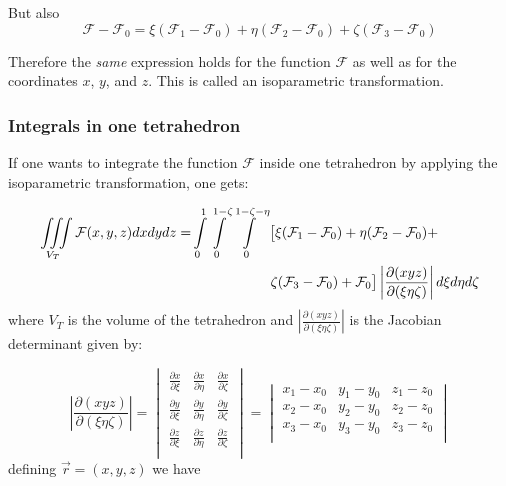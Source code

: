 \documentclass[10pt]{article}
\begin{document}
But also
\begin{equation}\label{parmf}
\mathcal{F}-\mathcal{F}_0=\xi(\mathcal{F}_1-\mathcal{F}_0)+\eta(\mathcal{F}_2-\mathcal{F}_0)%
+\zeta(\mathcal{F}_3-\mathcal{F}_0)
\end{equation}

Therefore the \textit{same} expression holds for the function $\mathcal{F}$ as well as for the
coordinates $x$, $y$, and $z$. This is called an isoparametric transformation.

\subsubsection{Integrals in one tetrahedron}

If one wants to integrate the function $\mathcal{F}$ inside one tetrahedron by applying the isoparametric
transformation, one gets:

\begin{equation}\label{intmf}
\begin{align}
\iiint\limits_{V_T}{\mathcal{F}(x,y,z)dxdydz}=&\int\limits_0^1{\int\limits_0^{1-\zeta}{%
\int\limits_0^{1-\zeta-\eta}{\bigl[\xi(\mathcal{F}_1-\mathcal{F}_0)+%
\eta(\mathcal{F}_2-\mathcal{F}_0)+}}}\\
&\hspace{20mm}\zeta(\mathcal{F}_3-\mathcal{F}_0)+\mathcal{F}_0\bigr]\left|\frac{\partial(xyz)}%
{\partial(\xi\eta\zeta)}\right| d\xi d\eta d\zeta
\end{align}
\end{equation}
where $V_T$ is the volume of the tetrahedron and $|\tfrac{\partial(xyz)}{\partial(\xi\eta\zeta)}|$ is the
Jacobian determinant given by:

\begin{equation}\label{jacobi}
\left|\frac{\partial(xyz)}{\partial(\xi\eta\zeta)}\right|=
\begin{vmatrix}
  \frac{\partial x}{\partial\xi} &   \frac{\partial x}{\partial\eta} &   \frac{\partial x}{\partial\zeta}  \\
  \frac{\partial y}{\partial\xi} &   \frac{\partial y}{\partial\eta} &   \frac{\partial y}{\partial\zeta}  \\
  \frac{\partial z}{\partial\xi} &   \frac{\partial z}{\partial\eta} &   \frac{\partial z}{\partial\zeta}  \\
\end{vmatrix}
=
\begin{vmatrix}
  x_1-x_0 & y_1-y_0 & z_1-z_0 \\
  x_2-x_0 & y_2-y_0 & z_2-z_0 \\
  x_3-x_0 & y_3-y_0 & z_3-z_0 \\
\end{vmatrix}
\end{equation}
defining $\vec{r}=(x,y,z)$ we have
\end{document}
